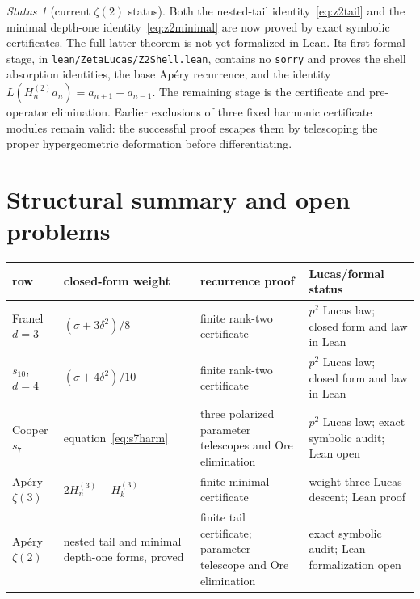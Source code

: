 \documentclass[11pt,reqno]{amsart}
\theoremstyle{definition}
\theoremstyle{remark}
\newtheorem{status}[theorem]{Status}
\begin{document}
\begin{status}[current $\zeta(2)$ status]\label{status:z2}
Both the nested-tail identity~\eqref{eq:z2tail} and the minimal depth-one
identity~\eqref{eq:z2minimal} are now proved by exact symbolic certificates.
The full latter theorem is not yet formalized in Lean.  Its first formal stage,
in \texttt{lean/ZetaLucas/Z2Shell.lean}, contains no \texttt{sorry} and proves
the shell absorption identities, the base Ap\'ery recurrence, and the identity
$L(H_n^{(2)}a_n)=a_{n+1}+a_{n-1}$.  The remaining stage is the certificate and
pre-operator elimination.  Earlier exclusions of three fixed harmonic
certificate modules remain valid: the successful proof escapes them by
telescoping the proper hypergeometric deformation before differentiating.
\end{status}

\section{Structural summary and open problems}

\begin{center}
\small
\begin{tabular}{>{\raggedright\arraybackslash}p{}
                >{\raggedright\arraybackslash}p{}
                >{\raggedright\arraybackslash}p{}
                >{\raggedright\arraybackslash}p{}}
\toprule
row & closed-form weight & recurrence proof & Lucas/formal status\\
\midrule
Franel $d=3$ & $(\sigma+3\delta^2)/8$ & finite rank-two certificate &
$p^2$ Lucas law; closed form and law in Lean\\
$s_{10}$, $d=4$ & $(\sigma+4\delta^2)/10$ & finite rank-two certificate &
$p^2$ Lucas law; closed form and law in Lean\\
Cooper $s_7$ & equation~\eqref{eq:s7harm} & three polarized parameter
telescopes and Ore elimination & $p^2$ Lucas law; exact symbolic audit;
Lean open\\
Ap\'ery $\zeta(3)$ & $2H_n^{(3)}-H_k^{(3)}$ & finite minimal certificate &
weight-three Lucas descent; Lean proof\\
Ap\'ery $\zeta(2)$ & nested tail and minimal depth-one forms, proved &
finite tail certificate; parameter telescope and Ore elimination &
exact symbolic audit; Lean formalization open\\
\bottomrule
\end{tabular}
\end{center}
\end{document}
